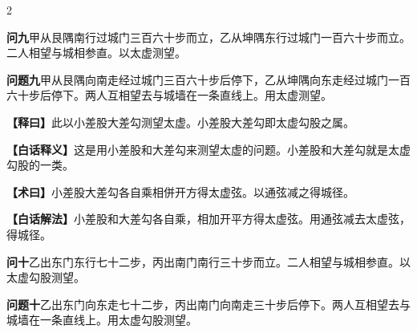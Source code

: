 \documentclass[11pt,a4paper]{article}
\newcommand{\WenQuestion}[1]{\textbf{\textcolor{classicalcolor}{#1}}}
\newcommand{\BaiQuestion}[1]{\textbf{\textcolor{moderncolor}{#1}}}
\newcommand{\WenExplain}{\textcolor{classicalcolor}{\textbf{【释曰】}}}
\newcommand{\BaiExplain}{\textcolor{moderncolor}{\textbf{【白话释义】}}}
\newcommand{\WenMethod}{\textcolor{classicalcolor}{\textbf{【术曰】}}}
\newcommand{\BaiMethod}{\textcolor{moderncolor}{\textbf{【白话解法】}}}
\begin{document}
\begin{paracol}{2}

\switchcolumn*
\begin{tcolorbox}[colback=red!3,colframe=red!30!black,boxrule=0.3pt]
\WenQuestion{问九}\quad 甲从艮隅南行过城门三百六十步而立，乙从坤隅东行过城门一百六十步而立。二人相望与城相参直。以太虚测望。
\end{tcolorbox}
\switchcolumn
\begin{tcolorbox}[colback=blue!3,colframe=blue!30!black,boxrule=0.3pt]
\BaiQuestion{问题九}\quad 甲从艮隅向南走经过城门三百六十步后停下，乙从坤隅向东走经过城门一百六十步后停下。两人互相望去与城墙在一条直线上。用太虚测望。
\end{tcolorbox}

\switchcolumn*
\begin{tcolorbox}[colback=red!5,colframe=red!30!black,boxrule=0.3pt]
\WenExplain\quad 此以小差股大差勾测望太虚。小差股大差勾即太虚勾股之属。
\end{tcolorbox}
\switchcolumn
\begin{tcolorbox}[colback=blue!5,colframe=blue!30!black,boxrule=0.3pt]
\BaiExplain\quad 这是用小差股和大差勾来测望太虚的问题。小差股和大差勾就是太虚勾股的一类。
\end{tcolorbox}

\switchcolumn*
\begin{tcolorbox}[colback=red!5,colframe=red!40!black,boxrule=0.3pt]
\WenMethod\quad 小差股大差勾各自乘相併开方得太虚弦。以通弦减之得城径。
\end{tcolorbox}
\switchcolumn
\begin{tcolorbox}[colback=blue!5,colframe=blue!40!black,boxrule=0.3pt]
\BaiMethod\quad 小差股和大差勾各自乘，相加开平方得太虚弦。用通弦减去太虚弦，得城径。
\end{tcolorbox}

\vspace{0.8em}

\switchcolumn*
\begin{tcolorbox}[colback=red!3,colframe=red!30!black,boxrule=0.3pt]
\WenQuestion{问十}\quad 乙出东门东行七十二步，丙出南门南行三十步而立。二人相望与城相参直。以太虚勾股测望。
\end{tcolorbox}
\switchcolumn
\begin{tcolorbox}[colback=blue!3,colframe=blue!30!black,boxrule=0.3pt]
\BaiQuestion{问题十}\quad 乙出东门向东走七十二步，丙出南门向南走三十步后停下。两人互相望去与城墙在一条直线上。用太虚勾股测望。
\end{tcolorbox}


\end{paracol}
\end{document}

